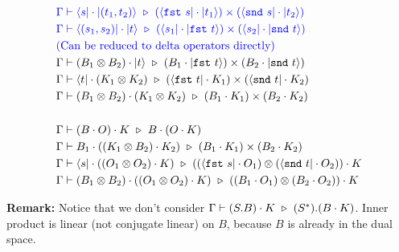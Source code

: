 \begin{align*}
  & \textcolor{blue}{\Gamma \vdash \langle s| \cdot |(t_1, t_2)\rangle \ \triangleright\  (\langle \texttt{fst}\ s| \cdot |t_1\rangle) \times (\langle \texttt{snd}\ s| \cdot |t_2\rangle)} \\
  & \textcolor{blue}{\Gamma \vdash \langle (s_1, s_2)| \cdot |t\rangle \ \triangleright\  (\langle s_1| \cdot |\texttt{fst}\ t\rangle) \times (\langle s_2| \cdot |\texttt{snd}\ t\rangle)} \\
  & \textcolor{blue}{\text{(Can be reduced to delta operators directly)}}
  \\
  & \Gamma \vdash (B_1 \otimes B_2) \cdot |t\rangle \ \triangleright\  (B_1 \cdot |\texttt{fst}\ t\rangle) \times (B_2 \cdot |\texttt{snd}\ t\rangle) \\
  & \Gamma \vdash \langle t| \cdot (K_1 \otimes K_2) \ \triangleright\  (\langle \texttt{fst}\ t| \cdot K_1) \times (\langle \texttt{snd}\ t| \cdot K_2) \\
  & \Gamma \vdash (B_1 \otimes B_2) \cdot (K_1 \otimes K_2) \ \triangleright\  (B_1 \cdot K_1) \times (B_2 \cdot K_2) \\
  \\
  & \Gamma \vdash (B \cdot O) \cdot K \ \triangleright\  B \cdot (O \cdot K) \\
  & \Gamma \vdash B_1 \cdot ((K_1 \otimes B_2) \cdot K_2) \ \triangleright\  (B_1 \cdot K_1) \times (B_2 \cdot K_2) \\
  & \Gamma \vdash \langle s| \cdot ((O_1 \otimes O_2) \cdot K) \ \triangleright\  ((\langle \texttt{fst}\ s| \cdot O_1) \otimes (\langle \texttt{snd}\ t| \cdot O_2)) \cdot K \\
  & \Gamma \vdash (B_1 \otimes B_2) \cdot ((O_1 \otimes O_2) \cdot K) \ \triangleright\  ((B_1 \cdot O_1) \otimes (B_2 \cdot O_2)) \cdot K \\
\end{align*}

\textbf{Remark:} Notice that we don't consider $\Gamma \vdash (S.B) \cdot K \ \triangleright\  (S^*).(B \cdot K)$. Inner product is linear (not conjugate linear) on $B$, because $B$ is already in the dual space.






